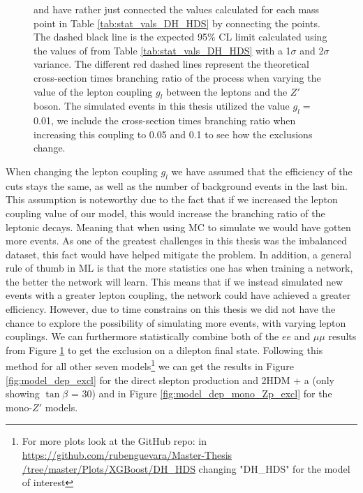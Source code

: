 \documentclass[12pt, a4paper]{book}
\begin{document}
\begin{figure}[!ht]
{   and have rather just connected the values calculated for each mass point in Table \ref{tab:stat_vals_DH_HDS} by connecting the points. The dashed black line is the expected 95\% CL limit calculated using the values of from Table \ref{tab:stat_vals_DH_HDS} with a 1$\sigma$ and 2$\sigma$ variance. 
   The different red dashed lines represent the theoretical cross-section times branching ratio of the process when varying the value of the lepton coupling $g_l$ between the leptons and the $Z'$ boson. The simulated events in this thesis utilized the value $g_l=$ 0.01, we include the cross-section times branching ratio when increasing this coupling to 0.05 and 0.1 to see how the exclusions change.  }\label{fig:DH_HDS_exclusion_ee_uu}
\end{figure}
\noindent When changing the lepton coupling $g_l$ we have assumed that the efficiency of the cuts stays the same, as well as the number of background events in the last bin. This assumption is noteworthy due to the fact that if we increased the lepton coupling value of our model, this would increase the branching ratio 
of the leptonic decays. Meaning that when using MC to simulate we would have gotten more events. As one of the greatest challenges in this thesis was the imbalanced dataset, this fact would have helped mitigate the problem. 
In addition, a general rule of thumb in ML is that the more statistics one has when training a network, the better the network will learn. 
This means that if we instead simulated new events with a greater lepton coupling, the network could have achieved a greater efficiency. However, due to time constrains on this thesis we did not have the chance to explore the possibility of simulating more events, with varying lepton couplings.
\clearpage\noindent We can furthermore statistically combine both of the $ee$ and $\mu\mu$ results from Figure \ref{fig:DH_HDS_exclusion_ee_uu} to get the exclusion on a dilepton final state. Following this method for all other seven models\footnote{For more plots look at the GitHub repo: in \href{https://github.com/rubenguevara/Master-Thesis/tree/master/Plots/XGBoost/DH_HDS}{https://github.com/rubenguevara/Master-Thesis\\/tree/master/Plots/XGBoost/DH\_HDS} changing "DH\_HDS" for the model of interest} 
we can get the results in Figure \ref{fig:model_dep_excl} for the direct slepton production and 2HDM + a (only showing $\tan\beta$ = 30) and in Figure \ref{fig:model_dep_mono_Zp_excl} for the mono-$Z'$ models.
\end{document}
